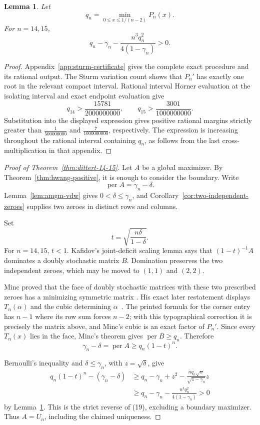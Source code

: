 \documentclass[10pt,a4paper]{amsart}
\newtheorem{lemma}[theorem]{Lemma}
\theoremstyle{definition}
\theoremstyle{remark}
\begin{document}
\begin{lemma}\label{lem:dittert-certificate}
Let
\[
 q_n=\min_{0\leq x\leq1/(n-2)}P_n(x).
\]
For \(n=14,15\),
\[
 q_n-\gamma_n-\frac{n^3q_n^2}{4(1-\gamma_n)}>0.
\]
\end{lemma}

\begin{proof}
Appendix~\ref{app:sturm-certificate} gives the complete exact procedure and
its rational output.  The Sturm variation count shows that \(P_n'\) has
exactly one root in the relevant compact interval.  Rational interval Horner
evaluation at the isolating interval and exact endpoint evaluation give
\[
 q_{14}>\frac{15781}{2000000000},\qquad
 q_{15}>\frac{3001}{1000000000}.
\]
Substitution into the displayed expression gives positive rational margins
strictly greater than \(\frac1{500000000}\) and
\(\frac7{1000000000}\), respectively. The expression is increasing
throughout the rational interval containing \(q_n\), as follows from the
last cross-multiplication in that appendix.
\end{proof}

\begin{proof}[Proof of Theorem~\ref{thm:dittert-14-15}]
Let \(A\) be a global maximizer.  By
Theorem~\ref{thm:hwang-positive}, it is enough to consider the boundary.
Write
\[
 \operatorname{per}A=\gamma_n-\delta.
\]
Lemma~\ref{lem:amgm-vdw} gives \(0<\delta\leq\gamma_n\), and
Corollary~\ref{cor:two-independent-zeroes} supplies two zeroes in distinct
rows and columns.

Set
\[
 t=\sqrt{\frac{n\delta}{1-\delta}}.
\]
For \(n=14,15\), \(t<1\). Kafidov's joint-deficit scaling lemma
\cite[Lemma 3.1]{Kafidov} says that \((1-t)^{-1}A\) dominates a doubly
stochastic matrix \(B\). Domination preserves the two independent zeroes,
which may be moved to \((1,1)\) and \((2,2)\).

Minc proved that the face of doubly stochastic matrices with these two
prescribed zeroes has a minimizing symmetric matrix
\cite{Minc84}. His exact later restatement displays \(T_n(\alpha)\) and the
cubic determining \(\alpha\)~\cite[p.~153]{Minc94}. The printed formula for
the corner entry has \(n-1\) where its row sum forces \(n-2\); with this
typographical correction it is precisely the matrix above, and Minc's cubic
is an exact factor of \(P_n'\). Since every \(T_n(x)\) lies in the face,
Minc's theorem gives \(\operatorname{per}B\geq q_n\). Therefore
\[
 \gamma_n-\delta=\operatorname{per}A
 \geq q_n(1-t)^n.                                  \tag{19}
\]

Bernoulli's inequality and \(\delta\leq\gamma_n\), with
\(z=\sqrt{\delta}\), give
\[
\begin{split}
q_n(1-t)^n-(\gamma_n-\delta)
&\geq q_n-\gamma_n+z^2
 -\frac{nq_n\sqrt n}{\sqrt{1-\gamma_n}}z\\
&\geq q_n-\gamma_n-\frac{n^3q_n^2}{4(1-\gamma_n)}>0
\end{split}
\]
by Lemma~\ref{lem:dittert-certificate}. This is the strict reverse of
(19), excluding a boundary maximizer. Thus \(A=U_n\), including the claimed
uniqueness.
\end{proof}
\end{document}
